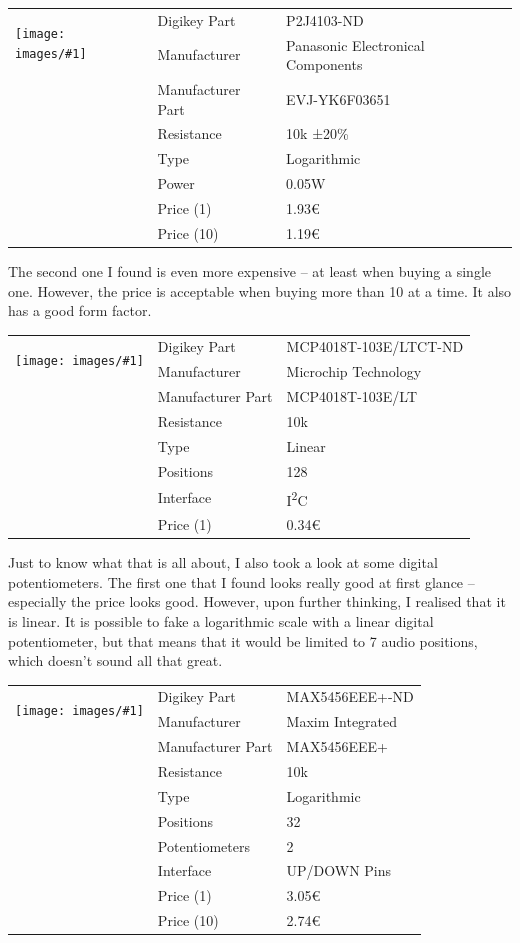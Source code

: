 \documentclass[a4paper]{article}
\makeatletter
\newenvironment{partdisplay}[1]{
\begin{center}
\begin{tabular}{@{}p{3cm}p{3cm}p{4.5cm}@{}}
\multirow{2}{3cm}{\texttt{[image: images/\#1]}}}{
\end{tabular}
\end{center}}
\makeatother
\begin{document}
\begin{partdisplay}{EVJY}
& Digikey Part & P2J4103-ND\\
& Manufacturer & Panasonic Electronical Components\\
& Manufacturer Part & EVJ-YK6F03651\\
& Resistance & 10k ±20\%\\
& Type & Logarithmic\\
& Power & 0.05W\\
& Price (1) & 1.93€\\
& Price (10) & 1.19€\\
\end{partdisplay}

The second one I found is even more expensive -- at least when buying a single one. However, the price is acceptable when buying more than 10 at a time. It also has a good form factor.

\begin{partdisplay}{soic6}
& Digikey Part & MCP4018T-103E/LTCT-ND\\
& Manufacturer & Microchip Technology\\
& Manufacturer Part & MCP4018T-103E/LT\\
& Resistance & 10k\\
& Type & Linear\\
& Positions & 128\\
& Interface & I\textsuperscript{2}C\\
& Price (1) & 0.34€\\  
\end{partdisplay}

Just to know what that is all about, I also took a look at some digital potentiometers. The first one that I found looks really good at first glance -- especially the price looks good. However, upon further thinking, I realised that it is linear. It is possible to fake a logarithmic scale with a linear digital potentiometer, but that means that it would be limited to 7 audio positions, which doesn't sound all that great.

\begin{partdisplay}{175-16-QSOP}
& Digikey Part & MAX5456EEE+-ND\\
& Manufacturer & Maxim Integrated\\
& Manufacturer Part & MAX5456EEE+\\
& Resistance & 10k\\
& Type & Logarithmic\\
& Positions & 32\\
& Potentiometers & 2\\
& Interface & UP/DOWN Pins\\
& Price (1) & 3.05€\\
& Price (10) & 2.74€\\
\end{partdisplay}
\end{document}
